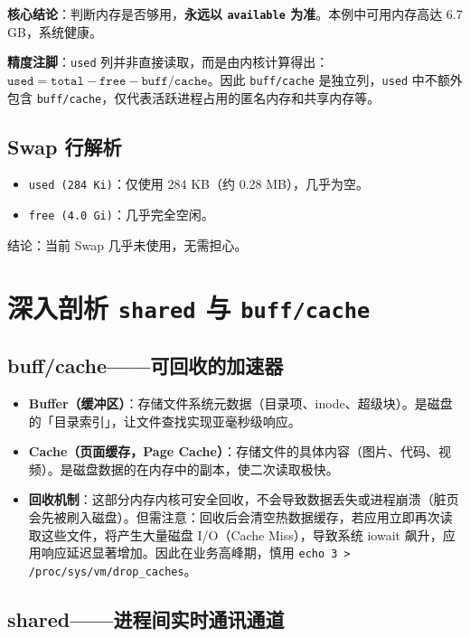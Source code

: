 \textbf{核心结论}：判断内存是否够用，\textbf{永远以 \texttt{available} 为准}。本例中可用内存高达 6.7 GB，系统健康。

\textbf{精度注脚}：\texttt{used} 列并非直接读取，而是由内核计算得出：$\texttt{used} = \texttt{total} - \texttt{free} - \texttt{buff/cache}$。因此 \texttt{buff/cache} 是独立列，\texttt{used} 中不额外包含 \texttt{buff/cache}，仅代表活跃进程占用的匿名内存和共享内存等。

\section{Swap 行解析}

\begin{itemize}[leftmargin=2cm]
	\item \texttt{used (284 Ki)}：仅使用 284 KB（约 0.28 MB），几乎为空。
	\item \texttt{free (4.0 Gi)}：几乎完全空闲。
\end{itemize}

结论：当前 Swap 几乎未使用，无需担心。


\chapter{深入剖析 \texttt{shared} 与 \texttt{buff/cache}}

\section{buff/cache——可回收的加速器}

\begin{itemize}[leftmargin=2cm]
	\item \textbf{Buffer（缓冲区）}：存储文件系统元数据（目录项、inode、超级块）。是磁盘的「目录索引」，让文件查找实现亚毫秒级响应。
	\item \textbf{Cache（页面缓存，Page Cache）}：存储文件的具体内容（图片、代码、视频）。是磁盘数据的在内存中的副本，使二次读取极快。
	\item \textbf{回收机制}：这部分内存内核可安全回收，不会导致数据丢失或进程崩溃（脏页会先被刷入磁盘）。但需注意：回收后会清空热数据缓存，若应用立即再次读取这些文件，将产生大量磁盘 I/O（Cache Miss），导致系统 iowait 飙升，应用响应延迟显著增加。因此在业务高峰期，慎用 \texttt{echo 3 > /proc/sys/vm/drop\_caches}。
\end{itemize}

\section{shared——进程间实时通讯通道}

